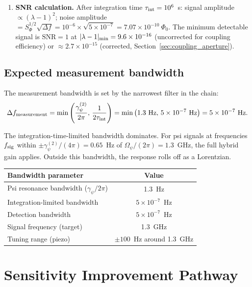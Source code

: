 \documentclass[11pt,twocolumn]{article}
\newcommand{\lam}{\lambda}
\newcommand{\Opsi}{\Omega_\psi}
\newcommand{\gpsi}{\gamma_\psi}
\newcommand{\ee}[1]{\times 10^{#1}}
\theoremstyle{definition}
\theoremstyle{remark}
\begin{document}
\begin{enumerate}[leftmargin=*,label=\textbf{Step \arabic*:}]
\item \textbf{SNR calculation.} After integration time $\tau_{\rm int} = 10^6$~s:
signal amplitude $\propto (\lam-1)^2$; noise amplitude $= S_\Phi^{1/2}\sqrt{\Delta f}
= 10^{-6}\times\sqrt{5\ee{-7}} = 7.07\ee{-10}~\Phi_0$. The minimum detectable
signal is $\mathrm{SNR} = 1$ at $|\lam-1|_{\rm min} = 9.6\ee{-16}$ (uncorrected
for coupling efficiency) or $\approx 2.7\ee{-15}$ (corrected, Section~\ref{sec:coupling_aperture}).

\end{enumerate}

\subsection{Expected measurement bandwidth}
\label{sec:bandwidth}

The measurement bandwidth is set by the narrowest filter in the chain:
\begin{equation}
\Delta f_{\rm measurement} = \min\left(\frac{\gpsi^{(2)}}{2\pi},\,
\frac{1}{2\tau_{\rm int}}\right)
= \min\left(1.3~\text{Hz},\,5\ee{-7}~\text{Hz}\right)
= 5\ee{-7}~\text{Hz}.
\label{eq:bandwidth}
\end{equation}

The integration-time-limited bandwidth dominates. For psi signals at
frequencies $f_{\rm sig}$ within $\pm\gpsi^{(2)}/(4\pi) = 0.65$~Hz of
$\Opsi/(2\pi) = 1.3$~GHz, the full hybrid gain applies. Outside this
bandwidth, the response rolls off as a Lorentzian.

\begin{center}
\begin{tabular}{@{}lc@{}}
\toprule
Bandwidth parameter & Value \\
\midrule
Psi resonance bandwidth ($\gpsi/2\pi$) & 1.3~Hz \\
Integration-limited bandwidth & $5\ee{-7}$~Hz \\
Detection bandwidth & $5\ee{-7}$~Hz \\
Signal frequency (target) & 1.3~GHz \\
Tuning range (piezo) & $\pm 100$~Hz around 1.3~GHz \\
\bottomrule
\end{tabular}
\end{center}

\section{Sensitivity Improvement Pathway}
\label{sec:pathway}
\end{document}
